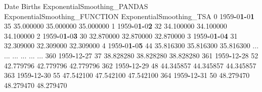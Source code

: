 \documentclass[
]{book}
\newenvironment{Shaded}{\begin{snugshade}}{\end{snugshade}}
\newcommand{\DecValTok}[1]{\textcolor[rgb]{0.00,0.00,0.81}{#1}}
\newcommand{\ErrorTok}[1]{\textcolor[rgb]{0.64,0.00,0.00}{\textbf{#1}}}
\newcommand{\FloatTok}[1]{\textcolor[rgb]{0.00,0.00,0.81}{#1}}
\newcommand{\NormalTok}[1]{#1}
\newcommand{\OperatorTok}[1]{\textcolor[rgb]{0.81,0.36,0.00}{\textbf{#1}}}
\begin{document}
\begin{Shaded}
\begin{Highlighting}[]
\NormalTok{    Date        Births  ExponentialSmoothing\_PANDAS ExponentialSmoothing\_FUNCTION   ExponentialSmoothing\_TSA}
\DecValTok{0}   \DecValTok{1959}\OperatorTok{{-}}\DecValTok{0}\ErrorTok{1}\OperatorTok{{-}}\DecValTok{0}\ErrorTok{1}      \DecValTok{35}                    \FloatTok{35.000000}                     \FloatTok{35.000000}                  \FloatTok{35.000000}
\DecValTok{1}   \DecValTok{1959}\OperatorTok{{-}}\DecValTok{0}\ErrorTok{1}\OperatorTok{{-}}\DecValTok{0}\ErrorTok{2}      \DecValTok{32}                    \FloatTok{34.100000}                     \FloatTok{34.100000}                  \FloatTok{34.100000}
\DecValTok{2}   \DecValTok{1959}\OperatorTok{{-}}\DecValTok{0}\ErrorTok{1}\OperatorTok{{-}}\DecValTok{0}\ErrorTok{3}      \DecValTok{30}                    \FloatTok{32.870000}                     \FloatTok{32.870000}                  \FloatTok{32.870000}
\DecValTok{3}   \DecValTok{1959}\OperatorTok{{-}}\DecValTok{0}\ErrorTok{1}\OperatorTok{{-}}\DecValTok{0}\ErrorTok{4}      \DecValTok{31}                    \FloatTok{32.309000}                     \FloatTok{32.309000}                  \FloatTok{32.309000}
\DecValTok{4}   \DecValTok{1959}\OperatorTok{{-}}\DecValTok{0}\ErrorTok{1}\OperatorTok{{-}}\DecValTok{0}\ErrorTok{5}      \DecValTok{44}                    \FloatTok{35.816300}                     \FloatTok{35.816300}                  \FloatTok{35.816300}
\NormalTok{...        ...     ...                          ...                           ...                        ...}
\DecValTok{360} \DecValTok{1959}\OperatorTok{{-}}\DecValTok{12}\OperatorTok{{-}}\DecValTok{27}      \DecValTok{37}                    \FloatTok{38.828280}                     \FloatTok{38.828280}                  \FloatTok{38.828280}
\DecValTok{361} \DecValTok{1959}\OperatorTok{{-}}\DecValTok{12}\OperatorTok{{-}}\DecValTok{28}      \DecValTok{52}                    \FloatTok{42.779796}                     \FloatTok{42.779796}                  \FloatTok{42.779796}
\DecValTok{362} \DecValTok{1959}\OperatorTok{{-}}\DecValTok{12}\OperatorTok{{-}}\DecValTok{29}      \DecValTok{48}                    \FloatTok{44.345857}                     \FloatTok{44.345857}                  \FloatTok{44.345857}
\DecValTok{363} \DecValTok{1959}\OperatorTok{{-}}\DecValTok{12}\OperatorTok{{-}}\DecValTok{30}      \DecValTok{55}                    \FloatTok{47.542100}                     \FloatTok{47.542100}                  \FloatTok{47.542100}
\DecValTok{364} \DecValTok{1959}\OperatorTok{{-}}\DecValTok{12}\OperatorTok{{-}}\DecValTok{31}      \DecValTok{50}                    \FloatTok{48.279470}                     \FloatTok{48.279470}                  \FloatTok{48.279470}
\end{Highlighting}
\end{Shaded}
\end{document}
